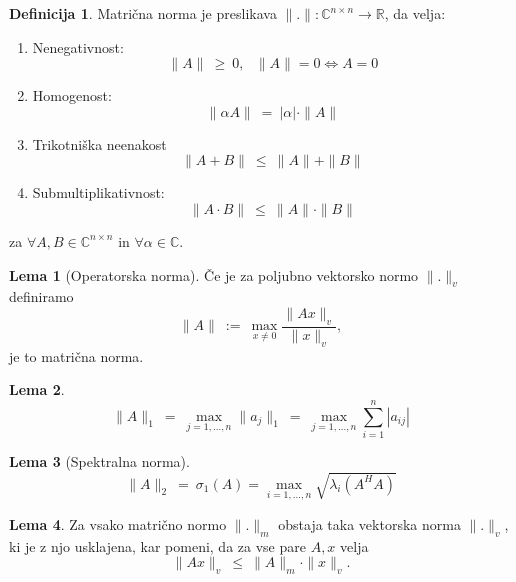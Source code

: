 \documentclass[11pt]{article}
\theoremstyle{definition}
\newtheorem{definicija}{Definicija}[section]
\newtheorem{lema}{Lema}
\begin{document}
\pagebreak

\begin{definicija}

Matrična norma je preslikava $\|.\|: \mathbb{C}^{n \times n} \rightarrow \mathbb{R}$, da velja:
\begin{enumerate}
	\item[1)] Nenegativnost:
	$$\|A\| ~\geq~ 0, ~~~\|A\| = 0 \Leftrightarrow A = 0$$
	\item[2)]Homogenost:
	 $$\|\alpha A\| ~=~ |\alpha| \cdot \|A\|$$
	\item[3)] Trikotniška neenakost
	$$\|A + B\| ~\leq~ \|A\| + \|B\|$$
	\item[4)] Submultiplikativnost:
	$$\|A \cdot B\| ~\leq~ \|A\| \cdot \|B\|$$
\end{enumerate}
za $\forall A, B \in \mathbb{C}^{n \times n}$ in $\forall \alpha \in \mathbb{C}$.

\end{definicija}
\vspace{0.5cm}

\begin{lema}[Operatorska norma]

Če je za poljubno vektorsko normo $\|.\|_v$ definiramo 
$$\|A\| ~:=~ \max_{x \neq 0} \frac{\|Ax\|_v}{\|x\|_v},$$
je to matrična norma.

\end{lema}
\vspace{0.5cm}

\begin{lema}

$$\|A\|_1 ~=~ \max_{j = 1, \ldots, n} \|a_j\|_1 ~=~ \max_{j = 1, \ldots, n} \sum_{i=1}^n |a_{ij}|$$

\end{lema}
\vspace{0.5cm}

\begin{lema}[Spektralna norma]

$$\|A\|_2 ~=~ \sigma_1 (A) = \max_{i = 1, \ldots, n} \sqrt{\lambda_i (A^H A)}$$

\end{lema}
\vspace{0.5cm}

\begin{lema}

Za vsako matrično normo $\|.\|_m$ obstaja taka vektorska norma $\|.\|_v$, ki je z njo usklajena, kar pomeni, da za vse pare $A, x$ velja
$$\|A x\|_v ~\leq~ \|A\|_m \cdot \|x\|_v.$$

\end{lema}
\vspace{0.5cm}
\end{document}
